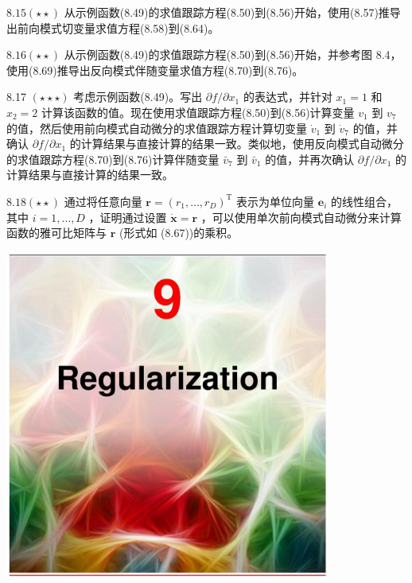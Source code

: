 \documentclass[10pt]{article}
\begin{document}
\({8.15}\left( {\star  \star  }\right)\) 从示例函数(8.49)的求值跟踪方程(8.50)到(8.56)开始，使用(8.57)推导出前向模式切变量求值方程(8.58)到(8.64)。

\({8.16}\left( {\star  \star  }\right)\) 从示例函数(8.49)的求值跟踪方程(8.50)到(8.56)开始，并参考图 8.4，使用(8.69)推导出反向模式伴随变量求值方程(8.70)到(8.76)。

8.17 \(\left( {\star  \star   \star  }\right)\) 考虑示例函数(8.49)。写出 \(\partial f/\partial {x}_{1}\) 的表达式，并针对 \({x}_{1} = 1\) 和 \({x}_{2} = 2\) 计算该函数的值。现在使用求值跟踪方程(8.50)到(8.56)计算变量 \({v}_{1}\) 到 \({v}_{7}\) 的值，然后使用前向模式自动微分的求值跟踪方程计算切变量 \({\dot{v}}_{1}\) 到 \({\dot{v}}_{7}\) 的值，并确认 \(\partial f/\partial {x}_{1}\) 的计算结果与直接计算的结果一致。类似地，使用反向模式自动微分的求值跟踪方程(8.70)到(8.76)计算伴随变量 \({\bar{v}}_{7}\) 到 \({\bar{v}}_{1}\) 的值，并再次确认 \(\partial f/\partial {x}_{1}\) 的计算结果与直接计算的结果一致。

\({8.18}\left( {\star  \star  }\right)\) 通过将任意向量 \(\mathbf{r} = {\left( {r}_{1},\ldots ,{r}_{D}\right) }^{\mathrm{T}}\) 表示为单位向量 \({\mathbf{e}}_{i}\) 的线性组合，其中 \(i = 1,\ldots ,D\) ，证明通过设置 \(\dot{\mathbf{x}} = \mathbf{r}\) ，可以使用单次前向模式自动微分来计算函数的雅可比矩阵与 \(\mathbf{r}\) (形式如 (8.67))的乘积。

\begin{center}
\includegraphics[max width=0.8\textwidth]{images/0194e279-9b28-703a-88f4-c3ac21e2010d_272_472_348_1077_1090_0.jpg}
\end{center}
\hspace*{3em} 
\end{document}
